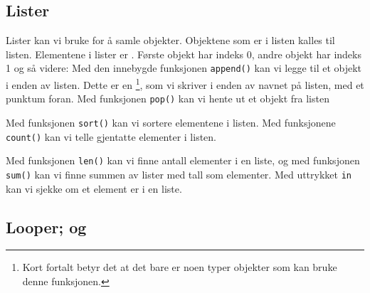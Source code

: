 \subsection{Lister}
Lister kan vi bruke for å samle objekter. Objektene som er i listen kalles  til listen.
Elementene i lister er . Første objekt har indeks 0, andre objekt har indeks 1 og så videre:
Med den innebygde funksjonen \texttt{append()} kan vi legge til et objekt i enden av listen. Dette er en \footnote{Kort fortalt betyr det at det bare er noen typer objekter som kan bruke denne funksjonen.}, som vi skriver i enden av navnet på listen, med et punktum foran.
\newpage
Med funksjonen \texttt{pop()} kan vi hente ut et objekt fra listen
 \vsk

Med funksjonen \texttt{sort()} kan vi sortere elementene i listen.
\vsk
\newpage
Med funksjonene \texttt{count()} kan vi telle gjentatte elementer i listen.
 \vsk

Med funksjonen \texttt{len()} kan vi finne antall elementer i en liste, og med funksjonen \texttt{sum()} kan vi finne summen av lister med tall som elementer.
\newpage
Med uttrykket \texttt{in} kan vi sjekke om et element er i en liste.


\newpage
\subsection{Looper;  og }
